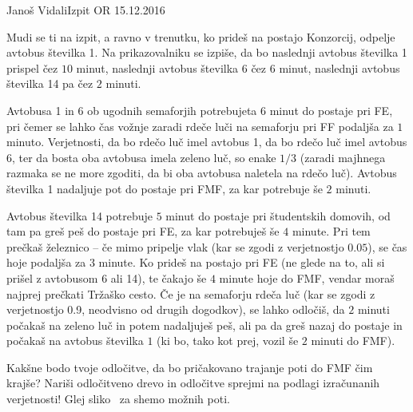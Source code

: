 \begin{naloga}{Janoš Vidali}{Izpit OR 15.12.2016}
\begin{vprasanje}[avtobus]
Mudi se ti na izpit, a ravno v trenutku,
ko prideš na postajo Konzorcij, odpelje avtobus številka 1.
Na prikazovalniku se izpiše,
da bo naslednji avtobus številka 1 prispel čez $10$ minut,
naslednji avtobus številka 6 čez $6$ minut,
naslednji avtobus številka 14 pa čez $2$ minuti.

Avtobusa 1 in 6 ob ugodnih semaforjih potrebujeta $6$ minut do postaje pri FE,
pri čemer se lahko čas vož\-nje zaradi rdeče luči na semaforju pri FF
podaljša za $1$ minuto.
Verjetnosti, da bo rdečo luč imel avtobus 1, da bo rdečo luč imel avtobus 6,
ter da bosta oba avtobusa imela zeleno luč, so enake $1/3$
(zaradi majhnega razmaka se ne more zgoditi,
da bi oba avtobusa naletela na rdečo luč).
Avtobus številka 1 nadaljuje pot do postaje pri FMF,
za kar potrebuje še $2$ minuti.

Avtobus številka 14 potrebuje $5$ minut do postaje pri študentskih domovih,
od tam pa greš peš do postaje pri FE, za kar potrebuješ še $4$ minute.
Pri tem prečkaš že\-lez\-ni\-co -- če mimo pripelje vlak
(kar se zgodi z verjetnostjo $0.05$),
se čas hoje podaljša za $3$ minute.
Ko prideš na postajo pri FE
(ne glede na to, ali si prišel z avtobusom 6 ali 14),
te čakajo še $4$ minute hoje do FMF,
vendar moraš najprej prečkati Tržaško cesto.
Če je na semaforju rdeča luč
(kar se zgodi z verjetnostjo 0.9, neodvisno od drugih dogodkov),
se lahko odločiš, da $2$ minuti počakaš na zeleno luč in potem nadaljuješ peš,
ali pa da greš nazaj do postaje in počakaš na avtobus številka $1$
(ki bo, tako kot prej, vozil še $2$ minuti do FMF).

Kakšne bodo tvoje odločitve,
da bo pričakovano trajanje poti do FMF čim krajše?
Nariši od\-lo\-čit\-ve\-no drevo
in odločitve sprejmi na podlagi izračunanih verjetnosti!
Glej sliko~\fig{} za shemo možnih poti.

\begin{slika}
\end{slika}
\end{vprasanje}
\end{naloga}

